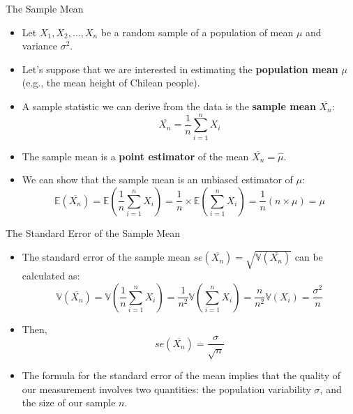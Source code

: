 \documentclass[handout]{beamer}
\begin{document}
\begin{frame}{The Sample Mean}
\scriptsize{

\begin{itemize}
 \item Let $X_1,X_2,\dots,X_n$ be a random sample of a population of mean $\mu$ and variance $\sigma^2$.
 \item Let's suppose that we are interested in estimating the \textbf{population mean} $\mu$ (e.g., the mean height of Chilean people).
 \item  A sample statistic we can derive from the data is the  \textbf{sample mean} $\overline{X_{n}}$:
 \begin{displaymath}
  \overline{X_{n}}=\frac{1}{n}\sum_{i=1}^{n} X_i
 \end{displaymath}
 \item The sample mean is a \textbf{point estimator} of the mean $\overline{X_{n}} = \hat{\mu}$.

\item We can show that the sample mean is an unbiased estimator of $\mu$:
\begin{displaymath}
\mathbb{E}(\overline{X_{n}}) = \mathbb{E}(\frac 1n \sum_{i=1}^{n} X_i)  =  \frac 1n \times \mathbb{E}(\sum_{i=1}^{n} X_i) = \frac 1n (n \times \mu) = \mu  
\end{displaymath}
\end{itemize}

} 
\end{frame}

\begin{frame}{The Standard Error of the Sample Mean}
\scriptsize{

\begin{itemize}
\item The standard error of the sample mean $se(\overline{X_{n}}) = \sqrt{\mathbb{V}(\overline{X_{n}})}$ can be calculated as:
\begin{displaymath}
 \mathbb{V}(\overline{X_{n}})=\mathbb{V}(\frac 1n \sum_{i=1}^{n} X_i) = \frac{1}{n^2} \mathbb{V}(\sum_{i=1}^{n} X_i) = \frac{n}{n^2} \mathbb{V}(X_i)=\frac{\sigma^2}{n} 
\end{displaymath}

\item Then,
\begin{displaymath}
 se(\overline{X_{n}}) = \frac{\sigma}{\sqrt{n}}
\end{displaymath}





\item The formula for the standard error of the mean implies that the quality of our measurement involves two quantities: the population variability $\sigma$, and the size of our sample $n$.

\end{itemize}


} 
\end{frame}
\end{document}
